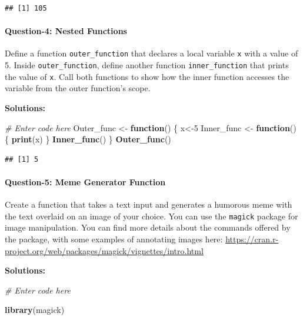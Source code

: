\documentclass[
]{article}
\newenvironment{Shaded}{\begin{snugshade}}{\end{snugshade}}
\newcommand{\CommentTok}[1]{\textcolor[rgb]{0.56,0.35,0.01}{\textit{#1}}}
\newcommand{\ControlFlowTok}[1]{\textcolor[rgb]{0.13,0.29,0.53}{\textbf{#1}}}
\newcommand{\DecValTok}[1]{\textcolor[rgb]{0.00,0.00,0.81}{#1}}
\newcommand{\FunctionTok}[1]{\textcolor[rgb]{0.13,0.29,0.53}{\textbf{#1}}}
\newcommand{\NormalTok}[1]{#1}
\newcommand{\OtherTok}[1]{\textcolor[rgb]{0.56,0.35,0.01}{#1}}
\begin{document}
\begin{verbatim}
## [1] 105
\end{verbatim}

\hypertarget{question-4-nested-functions}{%
\paragraph{Question-4: Nested
Functions}\label{question-4-nested-functions}}

Define a function \texttt{outer\_function} that declares a local
variable \texttt{x} with a value of 5. Inside \texttt{outer\_function},
define another function \texttt{inner\_function} that prints the value
of \texttt{x}. Call both functions to show how the inner function
accesses the variable from the outer function's scope.

\textbf{Solutions:}

\begin{Shaded}
\begin{Highlighting}[]
\CommentTok{\# Enter code here}
\NormalTok{Outer\_func }\OtherTok{\textless{}{-}} \ControlFlowTok{function}\NormalTok{() \{}
\NormalTok{  x}\OtherTok{\textless{}{-}}\DecValTok{5}
\NormalTok{  Inner\_func }\OtherTok{\textless{}{-}} \ControlFlowTok{function}\NormalTok{() \{}
    \FunctionTok{print}\NormalTok{(x)}
\NormalTok{  \}}
  \FunctionTok{Inner\_func}\NormalTok{()}
\NormalTok{\}}
\FunctionTok{Outer\_func}\NormalTok{()}
\end{Highlighting}
\end{Shaded}

\begin{verbatim}
## [1] 5
\end{verbatim}

\hypertarget{question-5-meme-generator-function}{%
\paragraph{Question-5: Meme Generator
Function}\label{question-5-meme-generator-function}}

Create a function that takes a text input and generates a humorous meme
with the text overlaid on an image of your choice. You can use the
\texttt{magick} package for image manipulation. You can find more
details about the commands offered by the package, with some examples of
annotating images here:
\url{https://cran.r-project.org/web/packages/magick/vignettes/intro.html}

\textbf{Solutions:}

\begin{Shaded}
\begin{Highlighting}[]
\CommentTok{\# Enter code here}

\FunctionTok{library}\NormalTok{(magick)}
\end{Highlighting}
\end{Shaded}
\end{document}
